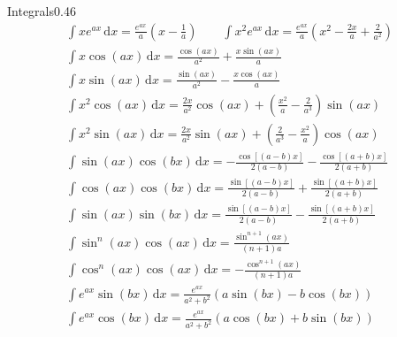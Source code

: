 


\begin{mytikzbox}{Integrals}{0.46}
\begin{gather*}
\int xe^{ax}\,\mathrm{d}x
=
\frac{e^{ax}}{a}\left(x-\frac{1}{a}\right)
\qquad
\int x^2e^{ax}\,\mathrm{d}x
=
\frac{e^{ax}}{a}\left(x^2-\frac{2x}{a}+\frac{2}{a^2}\right)
\\
\int x\cos(ax)\,\mathrm{d}x
=
\frac{\cos(ax)}{a^2}
+
\frac{x\sin(ax)}{a}
\\
\int x\sin(ax)\,\mathrm{d}x
=
\frac{\sin(ax)}{a^2}
-
\frac{x\cos(ax)}{a}
\\
\int x^2\cos(ax)\,\mathrm{d}x
=
\frac{2x}{a^2}\cos(ax)
+
\left(\frac{x^2}{a}-\frac{2}{a^3}\right)\sin(ax)
\\
\int x^2\sin(ax)\,\mathrm{d}x
=
\frac{2x}{a^2}\sin(ax)
+
\left(\frac{2}{a^3}-\frac{x^2}{a}\right)\cos(ax)
\\
\int\sin(ax)\cos(bx)\,\mathrm{d}x
=
-\frac{\cos[(a-b)x]}{2(a-b)}
-\frac{\cos[(a+b)x]}{2(a+b)}
\\
\int\cos(ax)\cos(bx)\,\mathrm{d}x
=
\frac{\sin[(a-b)x]}{2(a-b)}
+
\frac{\sin[(a+b)x]}{2(a+b)}
\\
\int\sin(ax)\sin(bx)\,\mathrm{d}x
=
\frac{\sin[(a-b)x]}{2(a-b)}
-
\frac{\sin[(a+b)x]}{2(a+b)}
\\
\int\sin^n(ax)\cos(ax)\,\mathrm{d}x
=
\frac{\sin^{n+1}(ax)}{(n+1)a}
\\
\int\cos^n(ax)\cos(ax)\,\mathrm{d}x
=
-\frac{\cos^{n+1}(ax)}{(n+1)a}
\\
\int e^{ax}\sin(bx)\,\mathrm{d}x
=
\frac{e^{ax}}{a^2+b^2}
\left(a\sin(bx)-b\cos(bx)\right)
\\
\int e^{ax}\cos(bx)\,\mathrm{d}x
=
\frac{e^{ax}}{a^2+b^2}
\left(a\cos(bx)+b\sin(bx)\right)
\end{gather*}
\end{mytikzbox}

